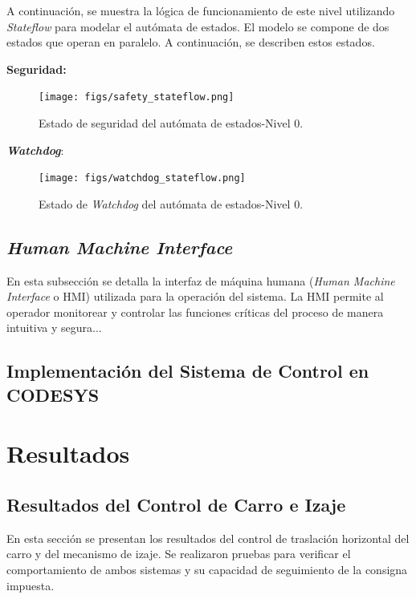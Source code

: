 \documentclass{article}
\begin{document}
            A continuación, se muestra la lógica de funcionamiento de este nivel utilizando \textit{Stateflow} para modelar el autómata de estados. El modelo se compone de dos estados que operan en paralelo. A continuación, se describen estos estados.

            \textbf{Seguridad:}
            \begin{figure} [H]
                \centering
                \texttt{[image: figs/safety\_stateflow.png]}
                \caption{Estado de seguridad del autómata de estados-Nivel 0.}
                \label{fig:safety_stateflow}
            \end{figure}

            \textbf{\textit{Watchdog}}:
            \begin{figure} [H]
                \centering
                \texttt{[image: figs/watchdog\_stateflow.png]}
                \caption{Estado de \textit{Watchdog} del autómata de estados-Nivel 0.}
                \label{fig:watchdog_stateflow}
            \end{figure}

            \subsection{\textit{Human Machine Interface}}

            En esta subsección se detalla la interfaz de máquina humana (\textit{Human Machine Interface} o HMI) utilizada para la operación del sistema. La HMI permite al operador monitorear y controlar las funciones críticas del proceso de manera intuitiva y segura...

            \subsection{Implementación del Sistema de Control en CODESYS}


            \section{Resultados}\label{sec:results}

            \subsection{Resultados del Control de Carro e Izaje}
            En esta sección se presentan los resultados del control de traslación horizontal del carro y del mecanismo de izaje. Se realizaron pruebas para verificar el comportamiento de ambos sistemas y su capacidad de seguimiento de la consigna impuesta.
\end{document}
